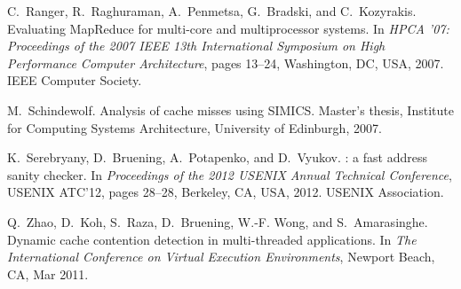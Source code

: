 \documentclass[10pt]{sigplanconf}
\begin{document}
\begin{thebibliography}{10}
C.~Ranger, R.~Raghuraman, A.~Penmetsa, G.~Bradski, and C.~Kozyrakis.
\newblock Evaluating {MapReduce} for multi-core and multiprocessor systems.
\newblock In {\em HPCA '07: Proceedings of the 2007 IEEE 13th International
  Symposium on High Performance Computer Architecture}, pages 13--24,
  Washington, DC, USA, 2007. IEEE Computer Society.

M.~Schindewolf.
\newblock Analysis of cache misses using {SIMICS}.
\newblock Master's thesis, Institute for Computing Systems Architecture,
  University of Edinburgh, 2007.

K.~Serebryany, D.~Bruening, A.~Potapenko, and D.~Vyukov.
: a fast address sanity checker.
\newblock In {\em Proceedings of the 2012 {USENIX} Annual Technical
  Conference}, USENIX ATC'12, pages 28--28, Berkeley, CA, USA, 2012. USENIX
  Association.

Q.~Zhao, D.~Koh, S.~Raza, D.~Bruening, W.-F. Wong, and S.~Amarasinghe.
\newblock Dynamic cache contention detection in multi-threaded applications.
\newblock In {\em The International Conference on Virtual Execution
  Environments}, Newport Beach, CA, Mar 2011.

\end{thebibliography}

\end{document}
